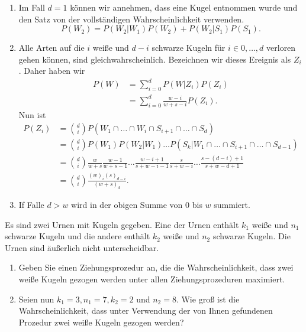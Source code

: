 \solution
\begin{enumerate}
    \item Im Fall $d=1$ können wir annehmen, dass eine Kugel entnommen wurde und
        den Satz von der vollständigen Wahrscheinlichkeit verwenden. 
        \begin{equation*}
            P(W_2) = P(W_2 | W_1 ) P(W_2 ) + P(W_2 | S_1) P(S_1).
        \end{equation*}

    \item Alle Arten auf die $i$ weiße und $d-i$ schwarze Kugeln für $i\in
        {0,\dots, d}$ verloren gehen können, sind gleichwahrscheinlich.
        Bezeichnen wir dieses Ereignis als $Z_i$.  Daher haben wir
        \begin{align*}
            P(W) &= \sum_{i=0}^{d} P(W | Z_i ) P(Z_i) \\
            &= \sum_{i=0}^{d} \frac{ w -i}{w+s-i} P(Z_i).
        \end{align*}
        Nun ist 
        \begin{align*}
            P(Z_i) &= \binom{d}{i} P( W_1\cap \dots\cap W_i\cap S_{i+1}\cap \dots\cap S_d ) \\
            &= \binom{d}{i} P(W_1) P(W_2 | W_1) \dots P( S_k | W_1\cap \dots\cap S_{i+1}\cap \dots\cap S_{d-1}) \\
            &= \binom{d}{i} \frac{w}{w+s}\frac{w-1}{w+s-1}\dots \frac{w-i+1}{s+w-i-1}
            \frac{s}{s+w-i}\dots\frac{s-(d-i)+1}{s+w -d+1} \\
            &= \binom{d}{i} \frac{ (w)_{i} (s)_{d-i} }{ (w+s)_{d}}.
        \end{align*}

    \item If Falle $d>w$ wird in der obigen Summe von $0$ bis $w$ summiert. 
\end{enumerate}




 Es
sind zwei Urnen mit Kugeln gegeben. Eine der Urnen enthält $k_1$ weiße und
$n_1$ schwarze Kugeln und die andere enthält $k_2$ weiße und $n_2$ schwarze
Kugeln. Die Urnen sind äußerlich nicht unterscheidbar.
\begin{enumerate}
    \item Geben Sie einen Ziehungsprozedur an, die die Wahrscheinlichkeit, dass
        zwei weiße Kugeln gezogen werden unter allen Ziehungsprozeduren maximiert.

    \item Seien nun $k_1=3, n_1=7, k_2=2$ und $n_2=8$. Wie groß ist die
        Wahrscheinlichkeit, dass unter Verwendung der von Ihnen gefundenen
        Prozedur zwei weiße Kugeln gezogen werden?
\end{enumerate}

